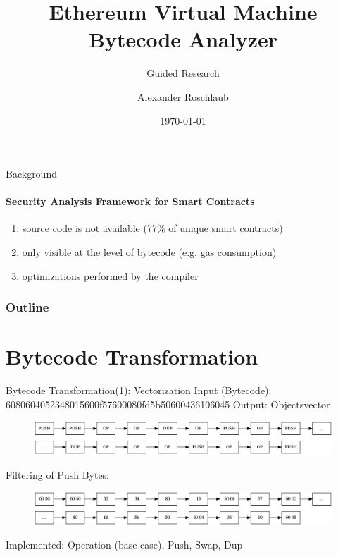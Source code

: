 \documentclass[11pt]{beamer}
\title{Ethereum Virtual Machine Bytecode Analyzer}
\subtitle{Guided Research}
\author{Alexander Roschlaub}
\date{\today}
\begin{document}
\begin{frame}
\titlepage
\end{frame}

\begin{frame}{Background}
\framesubtitle{Security Analysis Framework for Smart Contracts}
    \begin{enumerate}
        \item source code is not available (77\% of unique smart contracts\footnotemark)
        \item only visible at the level of bytecode (e.g. gas consumption)
        \item optimizations performed by the compiler 
    \end{enumerate}
\end{frame}

\begin{frame}
\frametitle{Outline}
\tableofcontents
\end{frame}


\section{Bytecode Transformation}

\begin{frame}{Bytecode Transformation(1): Vectorization}
Input (Bytecode): 6080604052348015600f57600080fd5b50600436106045
Output: Objectsvector
\begin{figure}
    \centering
    \includegraphics[scale=0.25]{figures/norm1_objects.png}
\end{figure}
Filtering of Push Bytes:
\begin{figure}
    \centering
    \includegraphics[scale=0.25]{figures/norm1.png}
\end{figure}
Implemented: Operation (base case), Push, Swap, Dup
\end{frame}
\end{document}
